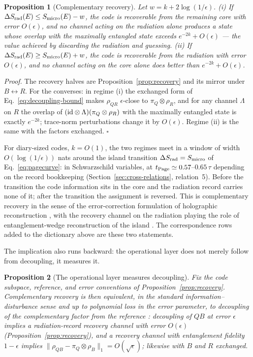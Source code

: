 \documentclass[12pt]{article}
\newcommand{\Smicro}{S_{\rm micro}}
\newtheorem{proposition}{Proposition}
\begin{document}
\begin{proposition}[Complementary recovery]
\label{prop:complementary}
Let $w=k+2\log(1/\epsilon)$.
(i) If $\Delta S_{\rm rad}(E)\le\Smicro(E)-w$, the code is recoverable from
the remaining core with error $O(\epsilon)$, and no channel acting on the
radiation alone produces a state whose overlap with the maximally entangled
state exceeds $e^{-2k}+O(\epsilon)$ --- the value achieved by discarding the
radiation and guessing.
(ii) If $\Delta S_{\rm rad}(E)\ge\Smicro(E)+w$, the code is recoverable from
the radiation with error $O(\epsilon)$, and no channel acting on the core
alone does better than $e^{-2k}+O(\epsilon)$.
\end{proposition}

\emph{Proof.}  The recovery halves are Proposition~\ref{prop:recovery} and
its mirror under $B\leftrightarrow R$.  For the converses: in regime (i) the
exchanged form of Eq.~\eqref{eq:decoupling-bound} makes $\rho_{QR}$
$\epsilon$-close to $\pi_Q\otimes\rho_R$, and for any channel $\Lambda$ on
$R$ the overlap of $({\rm id}\otimes\Lambda)(\pi_Q\otimes\rho_R)$ with the
maximally entangled state is exactly $e^{-2k}$; trace-norm perturbations
change it by $O(\epsilon)$.  Regime (ii) is the same with the factors
exchanged.  \hfill$\square$

For diary-sized codes, $k=O(1)$, the two regimes meet in a window of width
$O(\log(1/\epsilon))$ nats around the island transition
$\Delta S_{\rm rad}=\Smicro$ of Eq.~\eqref{eq:pagecurve}: in Schwarzschild
variables, at $t_{\rm Page}\simeq0.57$--$0.65\,\tau$ depending on the
record bookkeeping (Section~\ref{sec:cross-relations}, relation~5).  Before the transition the code
information sits in the core and the radiation record carries none of it;
after the transition the assignment is reversed.  This is complementary
recovery in the sense of the error-correction formulation of holographic
reconstruction \cite{AlmheiriDongHarlow2015,DongHarlowWall2016}, with the
recovery channel on the radiation playing the role of entanglement-wedge
reconstruction of the island
\cite{CotlerHaydenPeningtonSaltonSwingleWalter2019,Penington2019}.  The
correspondence rows added to the dictionary above are these two statements.

The implication also runs backward: the operational layer does not merely
follow from decoupling, it measures it.

\begin{proposition}[The operational layer measures decoupling]
\label{prop:decoupling-necessary}
Fix the code subspace, reference, and error conventions of
Proposition~\ref{prop:recovery}.  Complementary recovery is then
equivalent, in the standard information--disturbance sense and up to
polynomial loss in the error parameter, to decoupling of the complementary
factor from the reference
\cite{Schumacher1996,KretschmannSchlingemannWerner2008}: decoupling of
$QB$ at error $\epsilon$ implies a radiation-record recovery channel with
error $O(\epsilon)$ (Proposition~\ref{prop:recovery}), and a recovery
channel with entanglement fidelity $1-\epsilon$ implies
$\|\rho_{QB}-\pi_Q\otimes\rho_B\|_1=O(\sqrt\epsilon)$; likewise with $B$
and $R$ exchanged.
\end{proposition}
\end{document}
